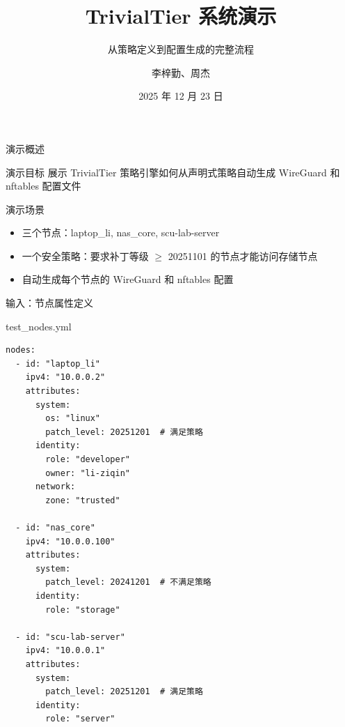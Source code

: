 \documentclass[aspectratio=169, 10pt]{beamer}
\title[TrivialTier Demo]{TrivialTier 系统演示}
\subtitle{从策略定义到配置生成的完整流程}
\author[李梓勤, 周杰]{李梓勤、周杰}
\institute[SCU]{四川大学网络空间安全学院}
\date{2025 年 12 月 23 日}
\begin{document}
\frame{\titlepage}

\begin{frame}{演示概述}
    \begin{block}{演示目标}
        展示 TrivialTier 策略引擎如何从声明式策略自动生成 WireGuard 和 nftables 配置文件
    \end{block}
    
    \begin{block}{演示场景}
        \begin{itemize}
            \item 三个节点：laptop\_li, nas\_core, scu-lab-server
            \item 一个安全策略：要求补丁等级 $\geq$ 20251101 的节点才能访问存储节点
            \item 自动生成每个节点的 WireGuard 和 nftables 配置
        \end{itemize}
    \end{block}
\end{frame}

\begin{frame}[fragile]{输入：节点属性定义}
    \begin{block}{test\_nodes.yml}
        \lstset{language=yaml, basicstyle=\tiny\ttfamily}
        \begin{lstlisting}
nodes:
  - id: "laptop_li"
    ipv4: "10.0.0.2"
    attributes:
      system:
        os: "linux"
        patch_level: 20251201  # 满足策略
      identity:
        role: "developer"
        owner: "li-ziqin"
      network:
        zone: "trusted"

  - id: "nas_core"
    ipv4: "10.0.0.100"
    attributes:
      system:
        patch_level: 20241201  # 不满足策略
      identity:
        role: "storage"

  - id: "scu-lab-server"
    ipv4: "10.0.0.1"
    attributes:
      system:
        patch_level: 20251201  # 满足策略
      identity:
        role: "server"
        \end{lstlisting}
    \end{block}
\end{frame}
\end{document}
